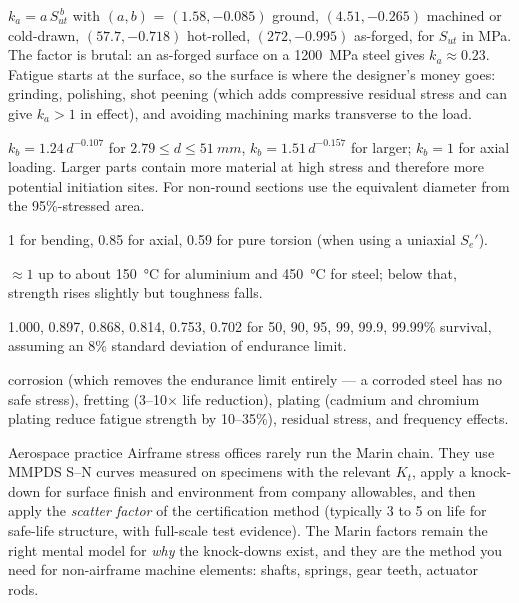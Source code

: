 \documentclass[11pt,a4paper]{article}
\begin{document}
\begin{description}[nosep,leftmargin=1.9cm,style=nextline]
  \item[$k_a$ surface] $k_a=a\,S_{ut}^{\,b}$ with $(a,b)$ = $(1.58,-0.085)$ ground, $(4.51,-0.265)$ machined or cold-drawn, $(57.7,-0.718)$ hot-rolled, $(272,-0.995)$ as-forged, for $S_{ut}$ in MPa. The factor is brutal: an as-forged surface on a \SI{1200}{MPa} steel gives $k_a\approx0.23$. Fatigue starts at the surface, so the surface is where the designer's money goes: grinding, polishing, shot peening (which adds compressive residual stress and can give $k_a>1$ in effect), and avoiding machining marks transverse to the load.
  \item[$k_b$ size] $k_b=1.24\,d^{-0.107}$ for $2.79\le d\le\SI{51}{mm}$, $k_b=1.51\,d^{-0.157}$ for larger; $k_b=1$ for axial loading. Larger parts contain more material at high stress and therefore more potential initiation sites. For non-round sections use the equivalent diameter from the 95\%-stressed area.
  \item[$k_c$ loading] 1 for bending, 0.85 for axial, 0.59 for pure torsion (when using a uniaxial $S_e'$).
  \item[$k_d$ temperature] $\approx 1$ up to about \SI{150}{\celsius} for aluminium and \SI{450}{\celsius} for steel; below that, strength rises slightly but toughness falls.
  \item[$k_e$ reliability] 1.000, 0.897, 0.868, 0.814, 0.753, 0.702 for 50, 90, 95, 99, 99.9, 99.99\% survival, assuming an 8\% standard deviation of endurance limit.
  \item[$k_f$ miscellaneous] corrosion (which removes the endurance limit entirely --- a corroded steel has no safe stress), fretting (3--10$\times$ life reduction), plating (cadmium and chromium plating reduce fatigue strength by 10--35\%), residual stress, and frequency effects.
\end{description}

\begin{aerobox}{Aerospace practice}
Airframe stress offices rarely run the Marin chain. They use MMPDS S--N curves measured on specimens with the relevant $K_t$, apply a knock-down for surface finish and environment from company allowables, and then apply the \emph{scatter factor} of the certification method (typically 3 to 5 on life for safe-life structure, with full-scale test evidence). The Marin factors remain the right mental model for \emph{why} the knock-downs exist, and they are the method you need for non-airframe machine elements: shafts, springs, gear teeth, actuator rods.
\end{aerobox}
\end{document}
